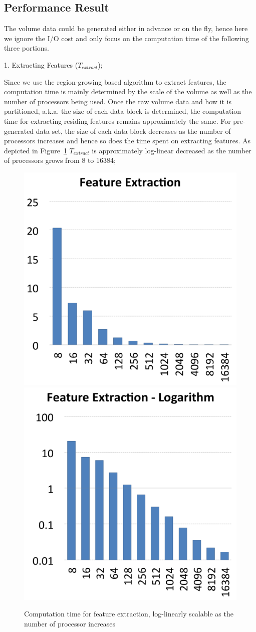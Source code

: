 \documentclass[10pt, conference, compsocconf]{IEEEtran}
\begin{document}
\subsection{Performance Result}
The volume data could be generated either in advance or on the fly, hence here we ignore the I/O cost and only focus on the computation time of the following three portions.

1. Extracting Features ($T_{extract}$);

Since we use the region-growing based algorithm to extract features, the computation time is mainly determined by the scale of the volume as well as the number of processors being used. Once the raw volume data and how it is partitioned, a.k.a. the size of each data block is determined, the computation time for extracting residing features remains approximately the same. For pre-generated data set, the size of each data block decreases as the number of processors increases and hence so does the time spent on extracting features. As depicted in Figure~\ref{fig:feature-extraction} $T_{extract}$ is approximately log-linear decreased as the number of processors grows from 8 to 16384;

\begin{figure}[ht]
	\centering
	\includegraphics[width=0.45\linewidth]{feature_extraction.png}
	\includegraphics[width=0.45\linewidth]{feature_extraction_log.png}
	\caption{Computation time for feature extraction, log-linearly scalable as the number of processor increases}
	\label{fig:feature-extraction}
\end{figure}
\end{document}
